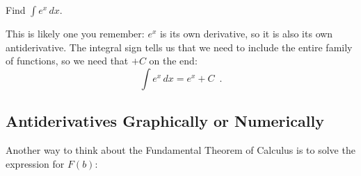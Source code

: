 \begin{example}
Find $\int e^x\,dx$.

\begin{solution}
This is likely one you remember: $e^x$ is its own derivative, so it is also its own antiderivative. The integral sign tells us that we need to include the entire family of functions, so we need that $+C$ on the end:
$$\int e^x\,dx = e^x+C \enspace .$$
\end{solution}\end{example}

\subsection{Antiderivatives Graphically or Numerically}
Another way to think about the Fundamental Theorem of Calculus is to solve the expression for $F(b)$:

